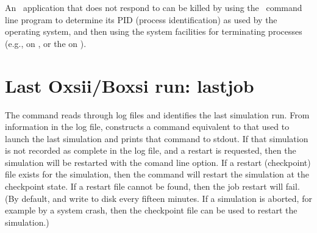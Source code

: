 An \OOMMF\ application that does not respond to  can be
killed by using the \OOMMF\ command line program
 to
determine its PID (process identification) as used by the operating
system, and then using the system facilities for terminating processes
(e.g.,  on \Unix, or the  on
\Windows).


\section{Last Oxsii/Boxsi run:
            lastjob\label{sec:lastjob}}%

The  command reads through  log files and identifies
the last simulation run.  From information in the log file,
 constructs a command equivalent to that used to launch the
last simulation and prints that command to stdout.  If that simulation
is not recorded as complete in the log file, and a restart is requested,
then the simulation will be restarted with the  comand
line option.  If a restart (checkpoint) file exists for the simulation,
then the command will restart the simulation at the checkpoint state.
If a restart file cannot be found, then the job restart will fail.  (By
default,  and  write  to disk every fifteen minutes.  If a
simulation is aborted, for example by a system crash, then the
checkpoint file can be used to restart the simulation.)

